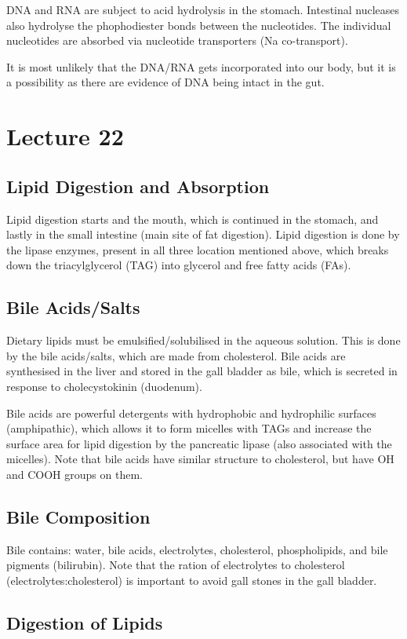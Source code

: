 \documentclass[a4paper, 12pt]{report}
\newcommand{\mychapter}[2]{
    \setcounter{chapter}{#1}
    \setcounter{section}{0}
    \chapter*{#2}
    \addcontentsline{toc}{chapter}{#2}
}
\begin{document}
DNA and RNA are subject to acid hydrolysis in the stomach.
Intestinal nucleases also hydrolyse the phophodiester bonds between the nucleotides.
The individual nucleotides are absorbed via nucleotide transporters (Na co-transport).

It is most unlikely that the DNA/RNA gets incorporated into our body, but it is a possibility as there are evidence of DNA being intact in the gut.

\mychapter{22}{Lecture 22}

\section{Lipid Digestion and Absorption}

Lipid digestion starts and the mouth, which is continued in the stomach, and lastly in the small intestine (main site of fat digestion).
Lipid digestion is done by the lipase enzymes, present in all three location mentioned above, which breaks down the triacylglycerol (TAG) into glycerol and free fatty acids (FAs).

\section{Bile Acids/Salts}

Dietary lipids must be emulsified/solubilised in the aqueous solution.
This is done by the bile acids/salts, which are made from cholesterol.
Bile acids are synthesised in the liver and stored in the gall bladder as bile, which is secreted in response to cholecystokinin (duodenum).

Bile acids are powerful detergents with hydrophobic  and hydrophilic surfaces (amphipathic), which allows it to form micelles with TAGs and increase the surface area for lipid digestion by the pancreatic lipase (also associated with the micelles).
Note that bile acids have similar structure to cholesterol, but have OH and COOH groups on them.

\section{Bile Composition}

Bile contains: water, bile acids, electrolytes, cholesterol, phospholipids, and bile pigments (bilirubin).
Note that the ration of electrolytes to cholesterol (electrolytes:cholesterol) is important to avoid gall stones in the gall bladder.

\section{Digestion of Lipids}
\end{document}
